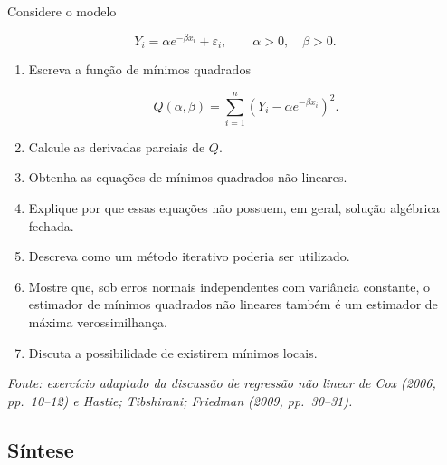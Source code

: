\documentclass[
  letterpaper,
  DIV=11,
  numbers=noendperiod]{scrreprt}
\begin{document}
\begin{tcolorbox}[enhanced jigsaw, colback=white, leftrule=.75mm, colbacktitle=quarto-callout-tip-color!10!white, breakable, titlerule=0mm, bottomtitle=1mm, title=\textcolor{quarto-callout-tip-color}{\faLightbulb}\hspace{0.5em}{Exercício 8 --- Mínimos quadrados não lineares}, colframe=quarto-callout-tip-color-frame, toprule=.15mm, opacityback=0, bottomrule=.15mm, opacitybacktitle=0.6, arc=.35mm, toptitle=1mm, rightrule=.15mm, coltitle=black, left=2mm]

Considere o modelo

\[Y_i
=
\alpha e^{-\beta x_i}
+
\varepsilon_i,
\qquad
\alpha>0,\quad\beta>0.\]

\begin{enumerate}
\def\labelenumi{\arabic{enumi}.}
\item
  Escreva a função de mínimos quadrados

  \[Q(\alpha,\beta)
  =
  \sum_{i=1}^n
  \left(
  Y_i-\alpha e^{-\beta x_i}
  \right)^2.\]
\item
  Calcule as derivadas parciais de \(Q\).
\item
  Obtenha as equações de mínimos quadrados não lineares.
\item
  Explique por que essas equações não possuem, em geral, solução
  algébrica fechada.
\item
  Descreva como um método iterativo poderia ser utilizado.
\item
  Mostre que, sob erros normais independentes com variância constante, o
  estimador de mínimos quadrados não lineares também é um estimador de
  máxima verossimilhança.
\item
  Discuta a possibilidade de existirem mínimos locais.
\end{enumerate}

\emph{Fonte: exercício adaptado da discussão de regressão não linear de
Cox (2006, pp.~10--12) e Hastie; Tibshirani; Friedman (2009,
pp.~30--31).}

\end{tcolorbox}

\subsection{Síntese}\label{suxedntese-1}
\end{document}

